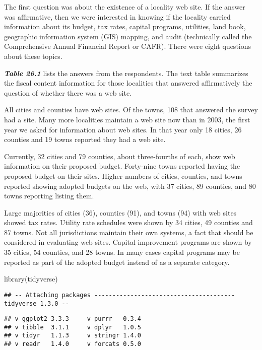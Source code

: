 \documentclass[
]{book}
\newenvironment{Shaded}{\begin{snugshade}}{\end{snugshade}}
\newcommand{\FunctionTok}[1]{\textcolor[rgb]{0.00,0.00,0.00}{#1}}
\newcommand{\NormalTok}[1]{#1}
\begin{document}
The first question was about the existence of a locality web site. If the answer was affirmative, then we were interested in knowing if the locality carried information about its budget, tax rates, capital programs, utilities, land book, geographic information system (GIS) mapping, and audit (technically called the Comprehensive Annual Financial Report or CAFR). There were eight questions about these topics.

\textbf{\emph{Table 26.1}} lists the answers from the respondents. The text table summarizes the fiscal content information for those localities that answered affirmatively the question of whether there was a web site.

All cities and counties have web sites. Of the towns, 108 that answered the survey had a site. Many more localities maintain a web site now than in 2003, the first year we asked for information about web sites. In that year only 18 cities, 26 counties and 19 towns reported they had a web site.

Currently, 32 cities and 79 counties, about three-fourths of each, show web information on their proposed budget. Forty-nine towns reported having the proposed budget on their sites. Higher numbers of cities, counties, and towns reported showing adopted budgets on the web, with 37 cities, 89 counties, and 80 towns reporting listing them.

Large majorities of cities (36), counties (91), and towns (94) with web sites showed tax rates. Utility rate schedules were shown by 34 cities, 49 counties and 87 towns. Not all jurisdictions maintain their own systems, a fact that should be considered in evaluating web sites. Capital improvement programs are shown by 35 cities, 54 counties, and 28 towns. In many cases capital programs may be reported as part of the adopted budget instead of as a separate category.

\begin{Shaded}
\begin{Highlighting}[]
\FunctionTok{library}\NormalTok{(tidyverse)}
\end{Highlighting}
\end{Shaded}

\begin{verbatim}
## -- Attaching packages --------------------------------------- tidyverse 1.3.0 --
\end{verbatim}

\begin{verbatim}
## v ggplot2 3.3.3     v purrr   0.3.4
## v tibble  3.1.1     v dplyr   1.0.5
## v tidyr   1.1.3     v stringr 1.4.0
## v readr   1.4.0     v forcats 0.5.0
\end{verbatim}
\end{document}
